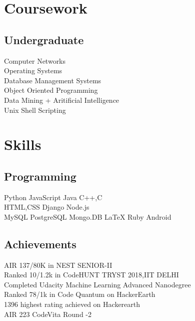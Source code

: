 \documentclass[]{deedy-resume-openfont}
\begin{document}
\begin{minipage}[t]{0.33\textwidth}

\section{Coursework}
\subsection{Undergraduate}
Computer Networks \\
Operating Systems \\
Database Management Systems\\
Object Oriented Programming \\
Data Mining + Aritificial Intelligence \\
Unix Shell Scripting \\


\section{Skills}
\subsection{Programming}
Python \textbullet{}   JavaScript \textbullet{} Java \textbullet{} C++,C \\
HTML,CSS \textbullet{} Django \textbullet{} Node.js \\
MySQL\textbullet{} PostgreSQL\textbullet{} Mongo.DB\textbullet{}
 LaTeX\textbullet{} Ruby \textbullet{} Android
\sectionsep


\subsection{Achievements}
\textbullet{}AIR 137/80K in NEST SENIOR-II\\
\textbullet{}Ranked 10/1.2k in CodeHUNT TRYST 2018,IIT DELHI\\
\textbullet{}Completed Udacity Machine Learning Advanced Nanodegree\\
\textbullet{}Ranked 78/1k in Code Quantum on HackerEarth\\
\textbullet{}1396 highest rating achieved on Hackerearth\\
\textbullet{}AIR 223 CodeVita Round -2
\sectionsep
%
%

\end{minipage}
\end{document}
